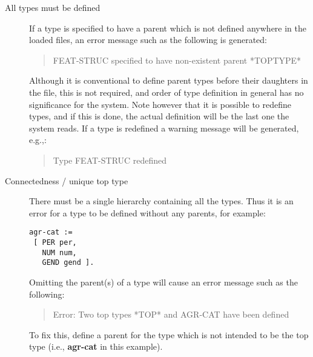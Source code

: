 \documentclass[12pt]{report}
\newenvironment{error}%
{\begin{quote}
\tt
}%
{\end{quote}
}
\newenvironment{warning}%
{\begin{quote}
\tt
}%
{\end{quote}
}
\begin{document}
\label{typehcond}
\begin{description}
\item[All types must be defined]
If a type is specified to have a parent which is not defined anywhere in the
loaded files, an error message such as the following is generated:
\begin{error}
FEAT-STRUC specified to have non-existent parent *TOPTYPE*
\end{error}
Although it is conventional to define parent types before their 
daughters in the file, this is not required, and order of type definition
in general has no significance for the system.
Note however that it is possible to redefine types, and if this is done, the
actual definition will be the last one the system reads.
If a type is redefined
a warning message will be generated, e.g.,:
\begin{warning}
Type FEAT-STRUC redefined
\end{warning}
\item[Connectedness / unique top type]
There must be a single hierarchy containing all the types.
Thus it is an error for a type to be defined without any parents,
for example:
\begin{verbatim}
agr-cat := 
 [ PER per,
   NUM num,
   GEND gend ]. 
\end{verbatim}
Omitting the parent(s) of a type will cause an error message such as
the following:
\begin{error}
Error: Two top types *TOP* and AGR-CAT have been defined
\end{error}
To fix this, define a parent for the type which is not intended to be
the top type (i.e., {\bf agr-cat} in this example).


\end{description}
\end{document}
